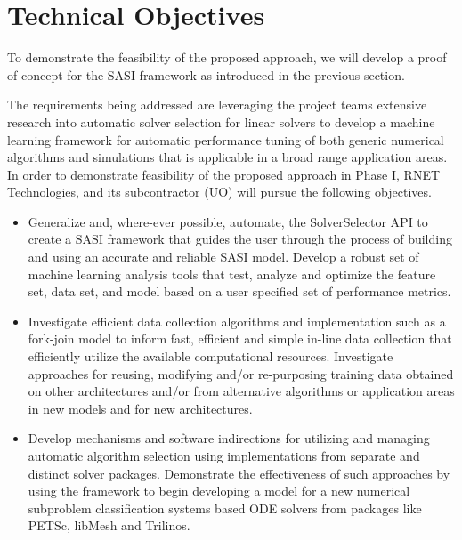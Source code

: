 \section{Technical Objectives}
 
To demonstrate the feasibility of the proposed approach,  we will develop a proof of concept for the SASI framework as introduced in the previous section. 

The requirements being addressed are leveraging the project teams extensive research into automatic solver selection
for linear solvers to develop a machine learning framework for automatic performance tuning of both generic numerical algorithms 
and simulations that is applicable in a broad range application areas. In order to demonstrate feasibility of the proposed approach in Phase I, RNET Technologies, and its subcontractor (UO) will pursue the following objectives.

\begin{itemize}
  \item Generalize and, where-ever possible, automate, the SolverSelector API to create a SASI framework that 
  guides the user through the process of building and using an accurate and reliable SASI model.  Develop a robust set of machine learning analysis tools that test, analyze and optimize the feature set, data set, and model based on a user specified set of performance metrics. 
  
  \item Investigate efficient data collection algorithms and implementation such as a fork-join model to inform fast, efficient and
  simple in-line data collection that efficiently utilize the available computational resources. Investigate approaches for reusing, modifying and/or re-purposing training data obtained on other architectures and/or from alternative algorithms or application areas in new models and for new architectures.
  
  \item Develop mechanisms and software indirections for utilizing and managing automatic algorithm selection using implementations from separate and distinct solver packages. Demonstrate the effectiveness of such approaches by using the framework to begin developing a model for a new numerical subproblem classification systems based ODE solvers from packages like PETSc, libMesh and Trilinos.  
 

\end{itemize}

